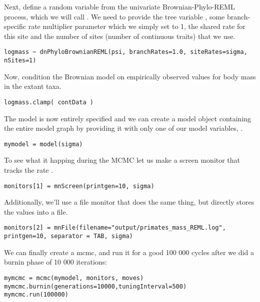 Next, define a random variable from the univariate Brownian-Phylo-REML process, which we will call .
We need to provide the tree variable , some branch-specific rate multiplier parameter which we simply set to 1, the shared rate for this site  and the number of sites (number of continuous traits) that we use. 
{\tt \small \begin{snugshade*}
\begin{lstlisting}
logmass ~ dnPhyloBrownianREML(psi, branchRates=1.0, siteRates=sigma, nSites=1)
\end{lstlisting}
\end{snugshade*}}
Now, condition the Brownian model on empirically observed values for body mass in the extant taxa.
{\tt \small \begin{snugshade*}
\begin{lstlisting}
logmass.clamp( contData )
\end{lstlisting}
\end{snugshade*}}

The model is now entirely specified and we can create a model object containing the entire model graph by providing it with only one of our model variables, \EG {}. 
{\tt \small \begin{snugshade*}
\begin{lstlisting}
mymodel = model(sigma)
\end{lstlisting}
\end{snugshade*}}

To see what it happing during the MCMC let us make a screen monitor that tracks the rate .
{\tt \small \begin{snugshade*}
\begin{lstlisting}
monitors[1] = mnScreen(printgen=10, sigma)
\end{lstlisting}
\end{snugshade*}}

Additionally, we'll use a file monitor that does the same thing, but directly stores the values into a file.
{\tt \small \begin{snugshade*}
\begin{lstlisting}
monitors[2] = mnFile(filename="output/primates_mass_REML.log", printgen=10, separator = TAB, sigma)
\end{lstlisting}
\end{snugshade*}}

We can finally create a mcmc, and run it for a good 100 000 cycles after we did a burnin phase of 10 000 iterations:
{\tt \small \begin{snugshade*}
\begin{lstlisting}
mymcmc = mcmc(mymodel, monitors, moves)
mymcmc.burnin(generations=10000,tuningInterval=500)
mymcmc.run(100000)
\end{lstlisting}
\end{snugshade*}}




